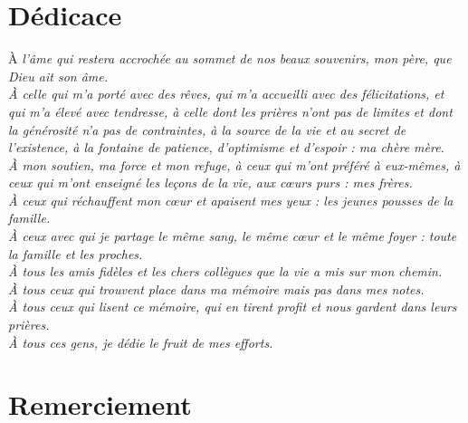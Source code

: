 \documentclass[12pt,a4paper]{report}%
\begin{document}
\chapter*{Dédicace}
\begin{center}
	\vspace{4cm}
	{\Huge  À }{{\it  l'âme qui restera accrochée au sommet de nos beaux souvenirs, mon père, que Dieu ait son âme.\\
			\vspace*{0.6cm}
			À celle qui m'a porté avec des rêves, qui m'a accueilli avec des félicitations, et qui m'a élevé avec tendresse, à celle dont les prières n'ont pas de limites et dont la générosité n'a pas de contraintes, à la source de la vie et au secret de l'existence, à la fontaine de patience, d'optimisme et d'espoir : ma chère mère.\\
			\vspace*{0.6cm}
			À mon soutien, ma force et mon refuge, à ceux qui m'ont préféré à eux-mêmes, à ceux qui m'ont enseigné les leçons de la vie, aux cœurs purs : mes frères.\\
			\vspace*{0.6cm}
			À ceux qui réchauffent mon cœur et apaisent mes yeux : les jeunes pousses de la famille.\\
			\vspace*{0.6cm}
			À ceux avec qui je partage le même sang, le même cœur et le même foyer : toute la famille et les proches.\\
			\vspace*{0.6cm}
			À tous les amis fidèles et les chers collègues que la vie a mis sur mon chemin.\\
			\vspace*{0.6cm}
			À tous ceux qui trouvent place dans ma mémoire mais pas dans mes notes.\\
			\vspace*{0.6cm}
			À tous ceux qui lisent ce mémoire, qui en tirent profit et nous gardent dans leurs prières.\\
			\vspace*{0.6cm}
			À tous ces gens, je dédie le fruit de mes efforts.  }}
\end{center}

\chapter*{Remerciement}
\vspace{4cm}
\end{document}
